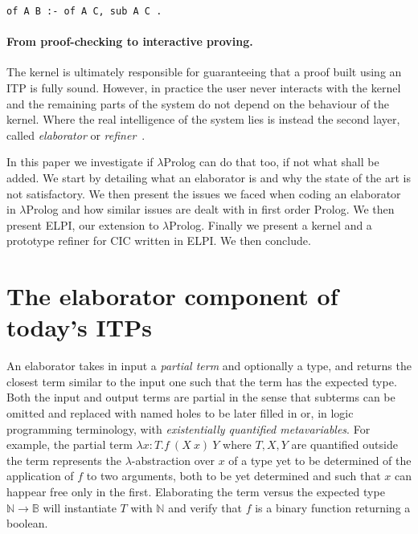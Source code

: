\documentclass{easychair}
\begin{document}
\begin{verbatim}
of A B :- of A C, sub A C .
\end{verbatim}


\paragraph{From proof-checking to interactive proving.}

The kernel is ultimately responsible for guaranteeing that a proof
built using an ITP is fully sound. However, in practice the user never
interacts with the kernel and the remaining parts of the system do not
depend on the behaviour of the kernel. Where the real intelligence of
the system lies is instead the second layer, called \emph{elaborator}
or \emph{refiner}~\cite{??,??,??}.


In this paper we investigate if $\lambda$Prolog can do that too, if not
what shall be added.  We start by detailing what an elaborator is and
why the state of the art is not satisfactory.  We then present the
issues
we faced when coding an elaborator in $\lambda$Prolog and how similar issues are
dealt with in first order Prolog.  We then present ELPI, our extension to
$\lambda$Prolog.  Finally we present a kernel and a prototype refiner for CIC
written in ELPI.  We then conclude.

\section{The elaborator component of today's ITPs}

An elaborator takes in input a \emph{partial term} and optionally a
type, and returns the closest term similar to the input one such that
the term has the expected type. Both the input and output terms are
partial in the sense that subterms can be omitted and replaced with
named holes to be later filled in or, in logic programming
terminology, with \emph{existentially quantified metavariables}. For
example, the partial term $\lambda x: T. f~(X~x)~Y$ where $T,X,Y$ are
quantified outside the term represents the $\lambda$-abstraction over
$x$ of a type yet to be determined of the application of $f$ to two
arguments, both to be yet determined and such that $x$ can happear
free only in the first. Elaborating the term versus the expected type
$\mathbb{N} \to \mathbb{B}$ will instantiate $T$ with $\mathbb{N}$ and
verify that $f$ is a binary function returning a boolean.
\end{document}
